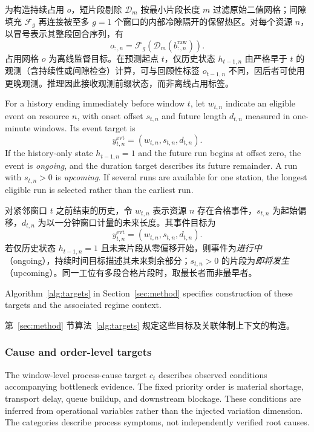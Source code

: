 \documentclass[a4paper,fleqn]{cas-dc}
\newcommand{\zhpara}[1]{%
  \par\begingroup\small\color{black!72}\noindent #1\par\endgroup}
\begin{document}
\zhpara{为构造持续占用 $o$，短片段剔除 $\mathcal{D}_{m}$ 按最小片段长度 $m$ 过滤原始二值网格；间隙填充 $\mathcal{F}_{g}$ 再连接被至多 $g=1$ 个窗口的内部冷隙隔开的保留热区。对每个资源 $n$，以冒号表示其整段回合序列，有
\begin{equation}
o_{:,n}=\mathcal{F}_{g}\!\left(\mathcal{D}_{m}
\left(b^{\mathrm{raw}}_{:,n}\right)\right).
\end{equation}
占用网格 $o$ 为离线监督目标。在预测起点 $t$，仅历史状态 $h_{t-1,n}$ 由严格早于 $t$ 的观测（含持续性或间隙检查）计算，可与回顾性标签 $o_{t-1,n}$ 不同，因后者可使用更晚观测。推理因此接收观测前缀状态，而非离线占用标签。}


For a history ending immediately before window $t$, let $w_{t,n}$ indicate an eligible event on resource $n$, with onset offset $s_{t,n}$ and future length $d_{t,n}$ measured in one-minute windows. Its event target is
\begin{equation}
y_{t,n}^{\mathrm{evt}}=(w_{t,n},s_{t,n},d_{t,n}).
\end{equation}
If the history-only state $h_{t-1,n}=1$ and the future run begins at offset zero, the event is \emph{ongoing}, and the duration target describes its future remainder. A run with $s_{t,n}>0$ is \emph{upcoming}. If several runs are available for one station, the longest eligible run is selected rather than the earliest run.

\zhpara{对紧邻窗口 $t$ 之前结束的历史，令 $w_{t,n}$ 表示资源 $n$ 存在合格事件，$s_{t,n}$ 为起始偏移，$d_{t,n}$ 为以一分钟窗口计量的未来长度。其事件目标为
\begin{equation}
y_{t,n}^{\mathrm{evt}}=(w_{t,n},s_{t,n},d_{t,n}).
\end{equation}
若仅历史状态 $h_{t-1,n}=1$ 且未来片段从零偏移开始，则事件为\emph{进行中}（ongoing），持续时间目标描述其未来剩余部分；$s_{t,n}>0$ 的片段为\emph{即将发生}（upcoming）。同一工位有多段合格片段时，取最长者而非最早者。}


Algorithm~\ref{alg:targets} in Section~\ref{sec:method} specifies construction of these targets and the associated regime context.

\zhpara{第~\ref{sec:method} 节算法~\ref{alg:targets} 规定这些目标及关联体制上下文的构造。}



\subsubsection{Cause and order-level targets}

The window-level process-cause target $c_t$ describes observed conditions accompanying bottleneck evidence. The fixed priority order is material shortage, transport delay, queue buildup, and downstream blockage. These conditions are inferred from operational variables rather than the injected variation dimension. The categories describe process symptoms, not independently verified root causes.
\end{document}
